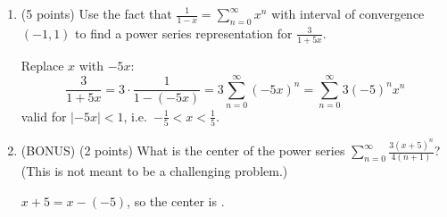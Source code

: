 \documentclass[12pt]{article}
\newcommand{\ds}{\displaystyle}
\begin{document}
\begin{enumerate}
\begin{enumerate}
  \item (5 points) Determine the interval of convergence of the power series.
    \begin{solution}
      Check the endpoints.

      $x = \frac23$: $\ds\sum_{n=0}^\infty 1^n$; the terms do not approach $0$, so it diverges
      by the divergence test.

      $x = -\frac23$: $\ds\sum_{n=0}^\infty (-1)^n$; the terms do not approach $0$, so it
      diverges by the divergence test.
      \[
        \boxed{\left( -\frac23,\ \frac23 \right)}
      \]
    \end{solution}
    \vfill
  \end{enumerate}

  \newpage

\item (5 points) Use the fact that
  $\ds \frac{1}{1-x} = \sum_{n=0}^{\infty} x^n$ with interval of
  convergence $(-1,1)$ to find a power series representation for
  $\ds \frac{3}{1+5x}$.
  \begin{solution}
    Replace $x$ with $-5x$:
    \[
      \frac{3}{1+5x} = 3 \cdot \frac{1}{1-(-5x)} = 3\sum_{n=0}^{\infty} (-5x)^n
      = \boxed{\sum_{n=0}^{\infty} 3(-5)^n x^n}
    \]
    valid for $|-5x| < 1$, i.e.\ $-\frac15 < x < \frac15$.
  \end{solution}

  \vfill

\item (BONUS) (2 points) What is the center of the power series
  $\ds \sum_{n=0}^{\infty} \frac{3(x+5)^n}{4(n+1)}$? (This is not meant to
  be a challenging problem.)
  \begin{solution}
    $x + 5 = x - (-5)$, so the center is .
  \end{solution}

  \vfill
  

\end{enumerate}
\end{document}
